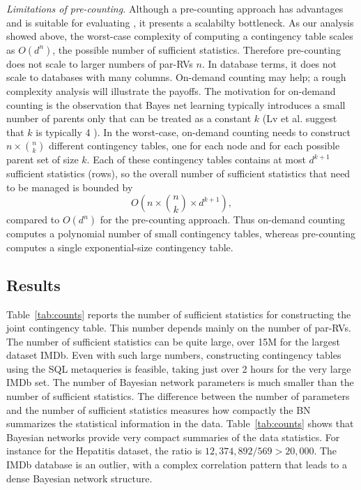 {\em Limitations of pre-counting.}
Although a pre-counting approach has advantages and is suitable for evaluating \FB, it presents a scalabilty bottleneck. As our analysis showed above, the worst-case complexity of computing a contingency table scales as $O(d^{n})$, the possible number of sufficient statistics. Therefore pre-counting does not scale to larger numbers of par-RVs $n$. In database terms, it does not scale to databases with many columns.  On-demand counting may help; a rough complexity analysis will illustrate the payoffs. The motivation for on-demand counting is the observation that Bayes net learning typically introduces a small  number of parents only that can be treated as a constant $k$ (Lv  et al. suggest that $k$ is typically 4 \cite{Lv2012}). In the worst-case, on-demand counting needs to construct $n \times {n \choose k}$ different contingency tables, one for each node and for each possible parent set of size $k$. Each of these contingency tables contains at most $d^{k+1}$ sufficient statistics (rows), so the overall number of sufficient statistics that need to be managed is bounded by $$O(n \times {n \choose k} \times d^{k+1}),$$ compared to $O(d^{n})$ for the pre-counting approach. Thus on-demand counting computes a polynomial number of small contingency tables, whereas pre-counting computes a single exponential-size contingency table. 

\subsection{Results}
Table~\ref{tab:counts} reports the number of sufficient statistics for constructing the joint contingency table. This number depends mainly on the number of par-RVs. The number of sufficient statistics can be quite large, over 15M for the largest dataset IMDb. 
Even with such large numbers, constructing contingency tables using the SQL metaqueries is feasible, taking just over 2 hours for the very large IMDb set. 
The number of Bayesian network parameters is much smaller than the number of sufficient statistics.
The difference between the number of parameters and the number of sufficient statistics measures how compactly the BN summarizes the statistical information in the data. %
Table~\ref{tab:counts} shows that Bayesian networks provide very compact summaries of the data statistics. For instance for the Hepatitis dataset, the ratio is  $12,374,892/569 > 20,000$. The IMDb database is an outlier, with a complex correlation pattern that leads to a dense Bayesian network structure.


